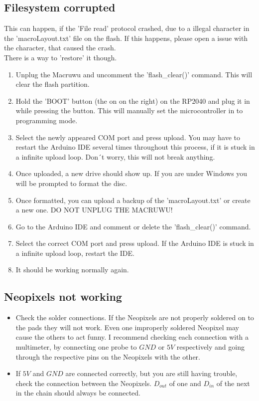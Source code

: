 \documentclass[english, 12pt]{scrartcl}
\begin{document}
	\subsection{Filesystem corrupted}
	This can happen, if the 'File read' protocol crashed, due to a illegal character in the 'macroLayout.txt' file on the flash. If this happens, please open a issue with the character, that caused the crash.\\
	There is a way to 'restore' it though.
	\begin{enumerate}
		\item Unplug the Macruwu and uncomment the 'flash\_clear()' command. This will clear the flash partition.
		\item Hold the 'BOOT' button (the on on the right) on the RP2040 and plug it in while pressing the button. This will manually set the microcontroller in to programming mode.
		\item Select the newly appeared COM port and press upload. You may have to restart the Arduino IDE several times throughout this process, if it is stuck in a infinite upload loop. Don´t worry, this will not break anything.
		\item Once uploaded, a new drive should show up. If you are under Windows you will be prompted to format the disc.
		\item Once formatted, you can upload a backup of the 'macroLayout.txt' or create a new one. DO NOT UNPLUG THE MACRUWU!
		\item Go to the Arduino IDE and comment or delete the 'flash\_clear()' command.
		\item Select the correct COM port and press upload. If the Arduino IDE is stuck in a infinite upload loop, restart the IDE. 
		\item It should be working normally again.
	\end{enumerate}
	\subsection{Neopixels not working}
	\begin{itemize}
		\item Check the solder connections. If the Neopixels are not properly soldered on to the pads they will not work. Even one improperly soldered Neopixel may cause the others to act funny. I recommend checking each connection with a multimeter, by connecting one probe to $GND$ or $5V$ respectively and going through the respective pins on the Neopixels with the other.
		\item If $5V$ and $GND$ are connected correctly, but you are still having trouble, check the connection between the Neopixels. $D_{out}$ of one and $D_{in}$ of the next in the chain should always be connected.
	\end{itemize}
\end{document}
